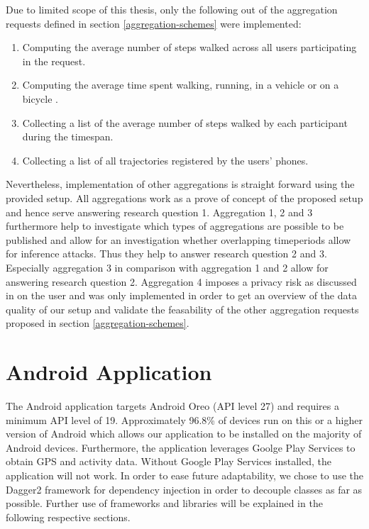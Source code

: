 \begin{samepage}
Due to limited scope of this thesis, only the following out of the aggregation requests defined in section \ref{aggregation-schemes} were implemented:
\begin{enumerate}
	\item Computing the average number of steps walked across all users participating in the request.
	\item Computing the average time spent walking, running, in a vehicle or on a bicycle \parencite{detected-activity}.
	\item Collecting a list of the average number of steps walked by each participant during the timespan.
	\item Collecting a list of all trajectories registered by the users' phones.
\end{enumerate}
\end{samepage}

Nevertheless, implementation of other aggregations is straight forward using the provided setup.
All aggregations work as a prove of concept of the proposed setup and hence serve answering research question 1. Aggregation 1, 2 and 3 furthermore help to investigate which types of aggregations are possible to be published and allow for an investigation whether overlapping timeperiods allow for inference attacks. Thus they help to answer research question 2 and 3. Especially aggregation 3 in comparison with aggregation 1 and 2 allow for answering research question 2.
Aggregation 4 imposes a privacy risk as discussed in \parencite{twitter, cellphone, krumm} on the user and was only implemented in order to get an overview of the data quality of our setup and validate the feasability of the other aggregation requests proposed in section \ref{aggregation-schemes}.

\section{Android Application}\label{android-app}
The Android application targets Android Oreo (API level 27) and requires a minimum API level of 19. Approximately 96.8\% of devices run on this or a higher version of Android \cite{android-api-level-share} which allows our application to be installed on the majority of Android devices.
Furthermore, the application leverages Goolge Play Services to obtain GPS and activity data. Without Google Play Services installed, the application will not work. In order to ease future adaptability, we chose to use the Dagger2 framework \parencite{dagger} for dependency injection in order to decouple classes as far as possible. Further use of frameworks and libraries will be explained in the following respective sections.

